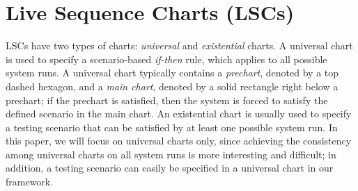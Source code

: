 \documentclass[]{llncs}
\begin{document}
\section{Live Sequence Charts (LSCs)}
\label{sec:lsc}

LSCs have two types of charts: {\em universal}
and {\em existential} charts. A universal chart is used to
specify a scenario-based {\em if-then} rule, which
applies to all possible system runs. A universal chart
typically contains a {\em prechart}, denoted by a top dashed hexagon,
and a {\em main chart}, denoted by a solid rectangle right below
a prechart;
if the prechart is satisfied, then the system is forced to
satisfy the defined scenario in the main chart.
An existential chart is usually used to specify a testing scenario
that can be satisfied by at least one possible system run.
In this paper, we will focus on universal charts only, since
achieving the consistency among universal charts on all system runs
is more interesting and difficult; in addition,
a testing scenario can easily be specified in a universal chart in
our framework.

\end{document}
